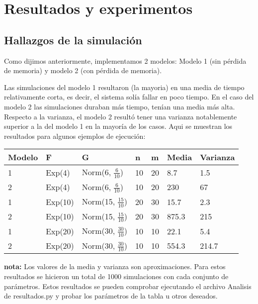 \documentclass[11pt]{article}
\begin{document}
    \newpage

    \section{Resultados y experimentos}
    \subsection{Hallazgos de la simulación}
    Como dijimos anteriormente, implementamos 2 modelos: Modelo 1 (sin pérdida de memoria) y modelo 2 (con pérdida de memoria).

    Las simulaciones del modelo 1 resultaron (la mayoria) en una media de tiempo relativamente corta, es decir, el sistema solía 
    fallar en poco tiempo. En el caso del modelo 2 las simulaciones duraban más tiempo, tenían una media más alta. Respecto a la 
    varianza, el modelo 2 resultó tener una varianza notablemente superior a la del modelo 1 en la mayoría de los casos. Aqui se 
    muestran los resultados para algunos ejemplos de ejecución:

    \begin{table}[h]
        \begin{tabular}{|l|l|l|l|l|l|l|}
            \hline \textbf{Modelo} & \textbf{F} & \textbf{G} & \textbf{n} & \textbf{m} & \textbf{Media} & \textbf{Varianza} \\ 
            \hline 1 & Exp(4) & Norm(6, $\frac{6}{10}$) & 10 & 20 & 8.7 & 1.5 \\
            \hline 2 & Exp(4) & Norm(6, $\frac{6}{10}$) & 10 & 20 & 230 & 67 \\
            \hline 1 & Exp(10) & Norm(15, $\frac{15}{10}$) & 20 & 30 & 15.7 & 2.3 \\
            \hline 2 & Exp(10) & Norm(15, $\frac{15}{10}$) & 20 & 30 & 875.3 & 215 \\
            \hline 1 & Exp(20) & Norm(30, $\frac{30}{10}$) & 10 & 10 & 22.1 & 5.4 \\
            \hline 2 & Exp(20) & Norm(30, $\frac{30}{10}$) & 10 & 10 & 554.3 & 214.7 \\
            \hline
        \end{tabular}
    \end{table}

    \noindent \textbf{nota:} Los valores de la media y varianza son aproximaciones. Para estos resultados se hicieron un total de 1000 
    simulaciones con cada conjunto de parámetros. Estos resultados se pueden comprobar ejecutando el archivo Analisis de resultados.py 
    y probar los parámetros de la tabla u otros deseados.
\end{document}
